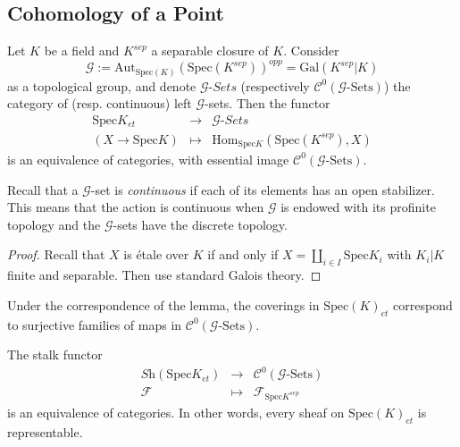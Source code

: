 \subsection{Cohomology of a Point}

\begin{lemma}
Let $K$ be a field and $K^{sep}$ a separable closure of $K$. Consider
$$
\mathcal{G} := \text{Aut}_{\text{Spec}(K)}(\text{Spec}(K^{sep}))^{opp}  = \text{Gal}(K^{sep} | K)
$$
as a topological group, and denote $\mathcal{G}\textit{-Sets}$ (respectively $\mathcal{C}^0(\mathcal{G}\text{-Sets})$) the category of (resp. continuous) left $\mathcal{G}$-sets. Then the functor
$$
\begin{array}{ccl}
\text{Spec} K _{et} &  \longrightarrow & \mathcal{G}\textit{-Sets} \\
(X\to\text{Spec} K) & \longmapsto & \text{Hom}_{\text{Spec} K}\left(\text{Spec}(K^{sep}), X\right)
\end{array}
$$
is an equivalence of categories, with essential image $\mathcal{C}^0(\mathcal{G}\text{-Sets})$.
\end{lemma}

Recall that a $\mathcal{G}$-set is \emph{continuous} if each of its elements has an open stabilizer. This means that the action is continuous when $\mathcal{G}$ is endowed with its profinite topology and the $\mathcal{G}$-sets have the discrete topology.

\begin{proof}
Recall that $X$ is \'etale over $K$ if and only if  $X=\coprod_{i\in I} \text{Spec} K_i$ with $K_i | K$ finite and separable. Then use standard Galois theory.
\end{proof}

\begin{remark}
Under the correspondence of the lemma, the coverings in $\text{Spec}(K)_{et}$ correspond to surjective families of maps in $\mathcal{C}^0(\mathcal{G}\text{-Sets})$. 
\end{remark}

\begin{lemma} \label{lem:EqOfCatContGSets}
The stalk functor
$$
\begin{array}{ccl}
\textit{Sh}(\text{Spec} K_{et}) & \longrightarrow & \mathcal{C}^0(\mathcal{G}\text{-Sets}) \\
\mathcal{F} & \longmapsto & \mathcal{F}_{\text{Spec} K^{sep}}
\end{array}
$$
is an equivalence of categories. In other words, every sheaf on $\text{Spec}(K)_{et}$ is representable.
\end{lemma}

